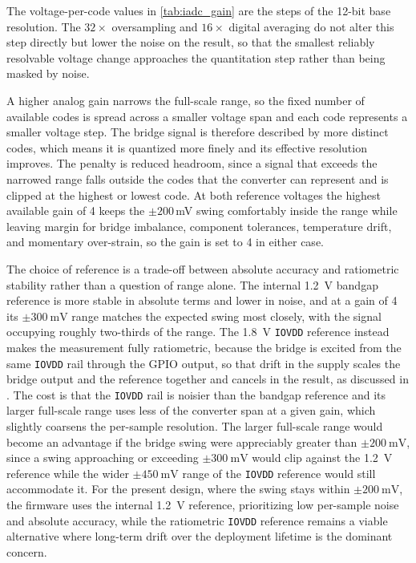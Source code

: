 The voltage-per-code values in \cref{tab:iadc_gain} are the steps of the 12-bit base resolution.
The $\num{32}\times$ oversampling and $\num{16}\times$ digital averaging do not alter this step directly but lower the noise on the result, so that the smallest reliably resolvable voltage change approaches the quantitation step rather than being masked by noise.

A higher analog gain narrows the full-scale range, so the fixed number of available codes is spread across a smaller voltage span and each code represents a smaller voltage step.
The bridge signal is therefore described by more distinct codes, which means it is quantized more finely and its effective resolution improves.
The penalty is reduced headroom, since a signal that exceeds the narrowed range falls outside the codes that the converter can represent and is clipped at the highest or lowest code.
At both reference voltages the highest available gain of 4 keeps the $\pm200$\,mV swing comfortably inside the range while leaving margin for bridge imbalance, component tolerances, temperature drift, and momentary over-strain, so the gain is set to 4 in either case.

The choice of reference is a trade-off between absolute accuracy and ratiometric stability rather than a question of range alone.
The internal \SI{1.2}{\volt} bandgap reference is more stable in absolute terms and lower in noise, and at a gain of 4 its $\pm\SI{300}{\milli\volt}$ range matches the expected swing most closely, with the signal occupying roughly two-thirds of the range.
The \SI{1.8}{\volt} \texttt{IOVDD} reference instead makes the measurement fully ratiometric, because the bridge is excited from the same \texttt{IOVDD} rail through the GPIO output, so that drift in the supply scales the bridge output and the reference together and cancels in the result, as discussed in .
The cost is that the \texttt{IOVDD} rail is noisier than the bandgap reference and its larger full-scale range uses less of the converter span at a given gain, which slightly coarsens the per-sample resolution.
The larger full-scale range would become an advantage if the bridge swing were appreciably greater than $\pm\SI{200}{\milli\volt}$, since a swing approaching or exceeding $\pm\SI{300}{\milli\volt}$ would clip against the \SI{1.2}{\volt} reference while the wider $\pm\SI{450}{\milli\volt}$ range of the \texttt{IOVDD} reference would still accommodate it.
For the present design, where the swing stays within $\pm\SI{200}{\milli\volt}$, the firmware uses the internal \SI{1.2}{\volt} reference, prioritizing low per-sample noise and absolute accuracy, while the ratiometric \texttt{IOVDD} reference remains a viable alternative where long-term drift over the deployment lifetime is the dominant concern.

